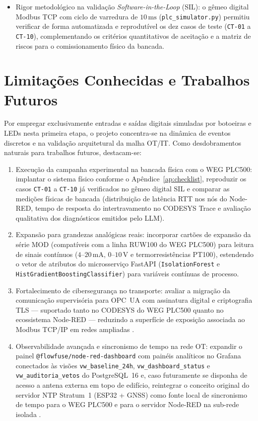 \begin{itemize}
  \item Rigor metodológico na validação \textit{Software-in-the-Loop} (SIL): o gêmeo digital Modbus TCP com ciclo de varredura de $10\,\text{ms}$ (\texttt{plc\_simulator.py}) permitiu verificar de forma automatizada e reprodutível os dez casos de teste (\texttt{CT-01} a \texttt{CT-10}), complementando os critérios quantitativos de aceitação e a matriz de riscos para o comissionamento físico da bancada.
\end{itemize}

\section{Limitações Conhecidas e Trabalhos Futuros}
\label{sec:cons_futuros}

Por empregar exclusivamente entradas e saídas digitais simuladas por botoeiras e LEDs nesta primeira etapa, o projeto concentra-se na dinâmica de eventos discretos e na validação arquitetural da malha OT/IT. Como desdobramentos naturais para trabalhos futuros, destacam-se:

\begin{enumerate}
  \item Execução da campanha experimental na bancada física com o WEG PLC500: implantar o sistema físico conforme o Apêndice~\ref{ap:checklist}, reproduzir os casos \texttt{CT-01} a \texttt{CT-10} já verificados no gêmeo digital SIL e comparar as medições físicas de bancada (distribuição de latência RTT nos nós do Node-RED, tempo de resposta do intertravamento no CODESYS Trace e avaliação qualitativa dos diagnósticos emitidos pelo LLM).
  \item Expansão para grandezas analógicas reais: incorporar cartões de expansão da série MOD (compatíveis com a linha RUW100 do WEG PLC500) para leitura de sinais contínuos ($4\text{--}20\,\text{mA}$, $0\text{--}10\,\text{V}$ e termorresistências PT100), estendendo o vetor de atributos do microsserviço FastAPI (\texttt{IsolationForest} e \texttt{HistGradientBoostingClassifier}) para variáveis contínuas de processo.
  \item Fortalecimento de cibersegurança no transporte: avaliar a migração da comunicação supervisória para OPC~UA com assinatura digital e criptografia TLS --- suportado tanto no CODESYS do WEG PLC500 quanto no ecossistema Node-RED --- reduzindo a superfície de exposição associada ao Modbus TCP/IP em redes ampliadas \cite{stouffer_nist_ot, iec_62443}.
  \item Observabilidade avançada e sincronismo de tempo na rede OT: expandir o painel \texttt{@flowfuse/node-red-dashboard} com painéis analíticos no Grafana conectados às visões \texttt{vw\_baseline\_24h}, \texttt{vw\_dashboard\_status} e \texttt{vw\_auditoria\_vetos} do PostgreSQL~16 e, caso futuramente se disponha de acesso a antena externa em topo de edifício, reintegrar o conceito original do servidor NTP Stratum~1 (ESP32 + GNSS) como fonte local de sincronismo de tempo para o WEG PLC500 e para o servidor Node-RED na sub-rede isolada \cite{rfc5905_ntp}.
\end{enumerate}
